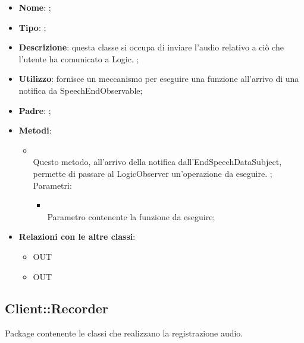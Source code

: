 \begin{itemize}
	\item \textbf{Nome}: ;
	\item \textbf{Tipo}: ;
	\item \textbf{Descrizione}: questa classe si occupa di inviare l'audio relativo a ciò che  l'utente ha comunicato a Logic.
;
	\item \textbf{Utilizzo}: fornisce un meccanismo per eseguire una funzione all'arrivo di una notifica da SpeechEndObservable;
	\item \textbf{Padre}: ;
	\item \textbf{Metodi}:
	\begin{itemize}
		\item[]  \\
		Questo metodo, all'arrivo della notifica dall'EndSpeechDataSubject, permette di passare al LogicObserver un'operazione da eseguire. ;\\
		Parametri:
		\begin{itemize}
			\item {} \\
			Parametro contenente la funzione da eseguire;
		\end{itemize}
	\end{itemize}
	\item \textbf{Relazioni con le altre classi}:
	\begin{itemize}
		\item OUT \hyperlink{SpeechEndObservable_label}{}
		\item OUT \hyperlink{HttpPromise_label}{}
	\end{itemize}
\end{itemize}
\FloatBarrier

\subsection{Client::Recorder}
Package contenente le classi che realizzano la registrazione audio.

